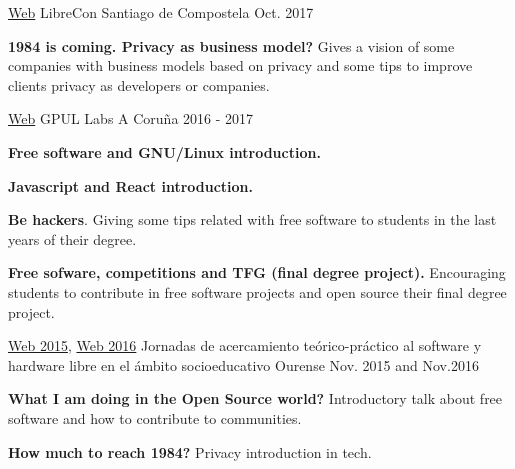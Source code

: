 


\begin{cventries}



\cventry
{\href{https://librecon.io}{Web}} %
{LibreCon} %
{Santiago de Compostela} %
{Oct. 2017} %
{ %
\begin{cvitems}
\item {\textbf{1984 is coming. Privacy as business model?} Gives a vision of some companies with business models based on privacy and some tips to improve clients privacy as developers or companies.}
\end{cvitems}
}


\cventry
{\href{https://labs.gpul.org/}{Web}} 
{GPUL Labs} %
{A Coruña} %
{2016 - 2017} %
{ %
\begin{cvitems}
\item{\textbf{Free software and GNU/Linux introduction.}}
\item{\textbf{Javascript and React introduction.}}
\item{\textbf{Be hackers}. Giving some tips related with free software to 
students in the last years of their degree.}
\item{\textbf{Free sofware, competitions and TFG (final degree project).} 
Encouraging students to contribute in free software projects and open source 
their final degree project.}
\end{cvitems}
}


\cventry
{\href{https://lignux.com/material-de-las-ii-jornadas-de-acercamiento-teorico-practico-al-software-y-hardware-libre-2015/}{Web 2015},
\href{https://lignux.com/material-de-las-iii-jornadas-de-acercamiento-teorico-practico-al-software-y-hardware-libre-2016/}{Web 2016}} 
{Jornadas de acercamiento teórico-práctico al software y hardware libre en
el ámbito socioeducativo} %
{Ourense} %
{Nov. 2015 and Nov.2016} %
{ %
\begin{cvitems}
\item {\textbf{What I am doing in the Open Source world?} Introductory talk
about free software and how to contribute to
communities.}
\item {\textbf{How much to reach 1984?} Privacy introduction in tech.}
\end{cvitems}
}



\end{cventries}
